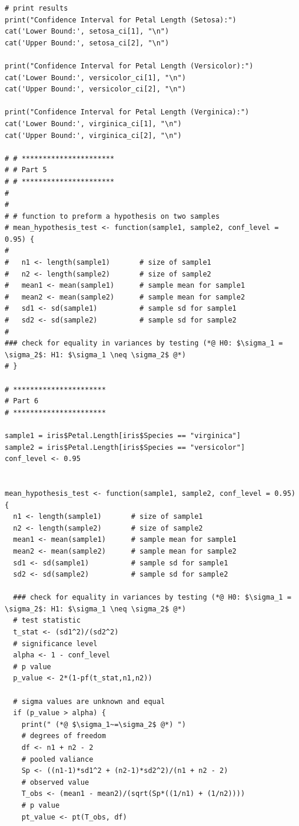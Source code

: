 \documentclass{article}
\begin{document}
\begin{lstlisting}[style=R]
# print results
print("Confidence Interval for Petal Length (Setosa):")
cat('Lower Bound:', setosa_ci[1], "\n")
cat('Upper Bound:', setosa_ci[2], "\n")

print("Confidence Interval for Petal Length (Versicolor):")
cat('Lower Bound:', versicolor_ci[1], "\n")
cat('Upper Bound:', versicolor_ci[2], "\n")

print("Confidence Interval for Petal Length (Verginica):")
cat('Lower Bound:', virginica_ci[1], "\n")
cat('Upper Bound:', virginica_ci[2], "\n")

# # **********************
# # Part 5
# # **********************
# 
# 
# # function to preform a hypothesis on two samples
# mean_hypothesis_test <- function(sample1, sample2, conf_level = 0.95) {
# 
#   n1 <- length(sample1)       # size of sample1
#   n2 <- length(sample2)       # size of sample2
#   mean1 <- mean(sample1)      # sample mean for sample1
#   mean2 <- mean(sample2)      # sample mean for sample2
#   sd1 <- sd(sample1)          # sample sd for sample1
#   sd2 <- sd(sample2)          # sample sd for sample2
# 
### check for equality in variances by testing (*@ H0: $\sigma_1 = \sigma_2$: H1: $\sigma_1 \neq \sigma_2$ @*)
# }

# **********************
# Part 6
# **********************

sample1 = iris$Petal.Length[iris$Species == "virginica"]
sample2 = iris$Petal.Length[iris$Species == "versicolor"]
conf_level <- 0.95


mean_hypothesis_test <- function(sample1, sample2, conf_level = 0.95) {
  n1 <- length(sample1)       # size of sample1
  n2 <- length(sample2)       # size of sample2
  mean1 <- mean(sample1)      # sample mean for sample1
  mean2 <- mean(sample2)      # sample mean for sample2
  sd1 <- sd(sample1)          # sample sd for sample1
  sd2 <- sd(sample2)          # sample sd for sample2
  
  ### check for equality in variances by testing (*@ H0: $\sigma_1 = \sigma_2$: H1: $\sigma_1 \neq \sigma_2$ @*)
  # test statistic
  t_stat <- (sd1^2)/(sd2^2)
  # significance level
  alpha <- 1 - conf_level
  # p value
  p_value <- 2*(1-pf(t_stat,n1,n2))
  
  # sigma values are unknown and equal
  if (p_value > alpha) {
    print(" (*@ $\sigma_1~=\sigma_2$ @*) ")
    # degrees of freedom
    df <- n1 + n2 - 2
    # pooled valiance
    Sp <- ((n1-1)*sd1^2 + (n2-1)*sd2^2)/(n1 + n2 - 2)
    # observed value
    T_obs <- (mean1 - mean2)/(sqrt(Sp*((1/n1) + (1/n2))))
    # p value
    pt_value <- pt(T_obs, df)
    

\end{lstlisting}
\end{document}
